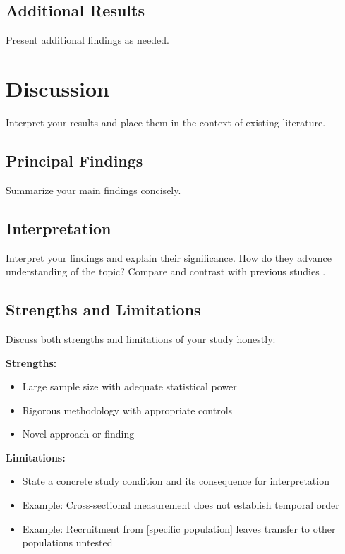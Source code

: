 \documentclass[10pt,letterpaper]{article}
\begin{document}
\subsection*{Additional Results}
Present additional findings as needed.

\section*{Discussion}

Interpret your results and place them in the context of existing literature.

\subsection*{Principal Findings}
Summarize your main findings concisely.

\subsection*{Interpretation}
Interpret your findings and explain their significance. How do they advance understanding of the topic? Compare and contrast with previous studies \cite{brown2021,williams2020}.

\subsection*{Strengths and Limitations}
Discuss both strengths and limitations of your study honestly:

\textbf{Strengths:}
\begin{itemize}
    \item Large sample size with adequate statistical power
    \item Rigorous methodology with appropriate controls
    \item Novel approach or finding
\end{itemize}

\textbf{Limitations:}
\begin{itemize}
    \item State a concrete study condition and its consequence for interpretation
    \item Example: Cross-sectional measurement does not establish temporal order
    \item Example: Recruitment from [specific population] leaves transfer to other populations untested
\end{itemize}
\end{document}
